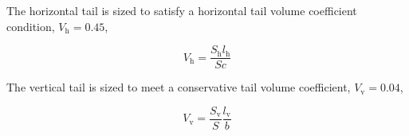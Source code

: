 The horizontal tail is sized to satisfy a horizontal tail volume coefficient condition, $V_{\text{h}} = 0.45$,\cite{aircraftrules}

\begin{equation}
    V_{\text{h}} = \frac{S_{\text{h}}l_{\text{h}}}{Sc}
\end{equation}

% 
% 
% 
% 
% 
% 

The vertical tail is sized to meet a conservative tail volume coefficient, $V_{\text{v}}= 0.04$,\cite{aircraftrules}

\begin{equation}
    \label{e:vtv}
    V_{\text{v}} = \frac{S_{\text{v}}}{S} \frac{l_{\text{v}}}{b}
\end{equation}

